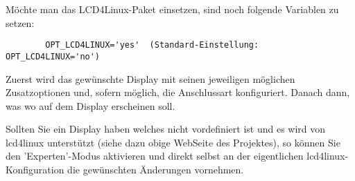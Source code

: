     Möchte man das LCD4Linux-Paket einsetzen, sind noch folgende Variablen zu
    setzen:

\begin{example}
\begin{verbatim}
        OPT_LCD4LINUX='yes'  (Standard-Einstellung: OPT_LCD4LINUX='no')
\end{verbatim}
\end{example}

    Zuerst wird das gewünschte Display mit seinen jeweiligen möglichen Zusatzoptionen
    und, sofern möglich, die Anschlussart konfiguriert. Danach dann, was wo auf
    dem Display erscheinen soll.

    Sollten Sie ein Display haben welches nicht vordefiniert ist und es wird von
    lcd4linux unterstützt (siehe dazu obige WebSeite des Projektes), so können
    Sie den 'Experten'-Modus aktivieren und direkt selbst an der eigentlichen
    lcd4linux-Konfiguration die gewünschten Änderungen vornehmen.



